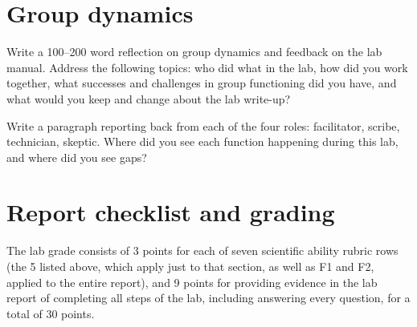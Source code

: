\section{Group dynamics}

\begin{steps}
	\item Write a 100--200 word reflection on group dynamics and feedback on the lab manual. Address the following topics: who did what in the lab, how did you work together, what successes and challenges in group functioning did you have, and what would you keep and change about the lab write-up?
	
	\item Write a paragraph reporting back from each of the four roles: facilitator, scribe, technician, skeptic. Where did you see each function happening during this lab, and where did you see gaps?
\end{steps}

\section{Report checklist and grading}

The lab grade consists of 3 points for each of seven scientific ability rubric rows (the 5 listed above, which apply just to that section, as well as F1 and F2, applied to the entire report), and 9 points for providing evidence in the lab report of completing all steps of the lab, including answering every question, for a total of 30 points.